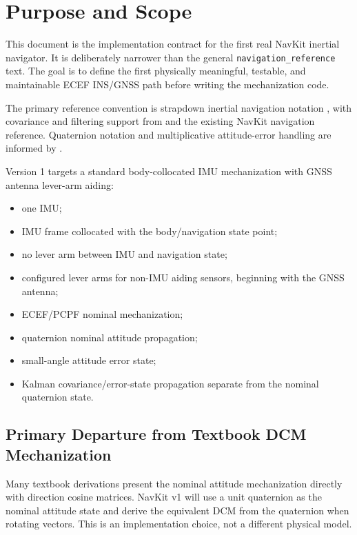 \chapter{Purpose and Scope}

This document is the implementation contract for the first real NavKit
inertial navigator. It is deliberately narrower than the general
\texttt{navigation\_reference} text. The goal is to define the first physically
meaningful, testable, and maintainable ECEF INS/GNSS path before writing the
mechanization code.

The primary reference convention is strapdown inertial navigation notation
\cite{groves2013,titterton2004}, with covariance and filtering support from
\cite{simon2006} and the existing NavKit navigation reference. Quaternion
notation and multiplicative attitude-error handling are informed by
\cite{sola2018}.

\begin{scopebox}
Version 1 targets a standard body-collocated IMU mechanization with GNSS
antenna lever-arm aiding:
\begin{itemize}
    \item one IMU;
    \item IMU frame collocated with the body/navigation state point;
    \item no lever arm between IMU and navigation state;
    \item configured lever arms for non-IMU aiding sensors, beginning with the
    GNSS antenna;
    \item ECEF/PCPF nominal mechanization;
    \item quaternion nominal attitude propagation;
    \item small-angle attitude error state;
    \item Kalman covariance/error-state propagation separate from the nominal quaternion state.
\end{itemize}
\end{scopebox}

\section{Primary Departure from Textbook DCM Mechanization}

Many textbook derivations present the nominal attitude mechanization directly
with direction cosine matrices. NavKit v1 will use a unit quaternion as the
nominal attitude state and derive the equivalent DCM from the quaternion when
rotating vectors. This is an implementation choice, not a different physical
model.

